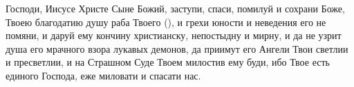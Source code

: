 \mychapterending


\begin{mymulticols}
 


Господи, Иисусе Христе Сыне Божий, заступи, спаси, помилуй и сохрани Боже, Твоею благодатию душу раба Твоего (), и грехи юности и неведения его не помяни, и даруй ему кончину христианску, непостыдну и мирну, и да не узрит душа его мрачного взора лукавых демонов, да приимут его Ангели Твои светлии и пресветлии, и на Страшном Суде Твоем милостив ему буди, ибо Твое есть единого Господа, еже миловати и спасати нас. 

\end{mymulticols}

\mychapterending


